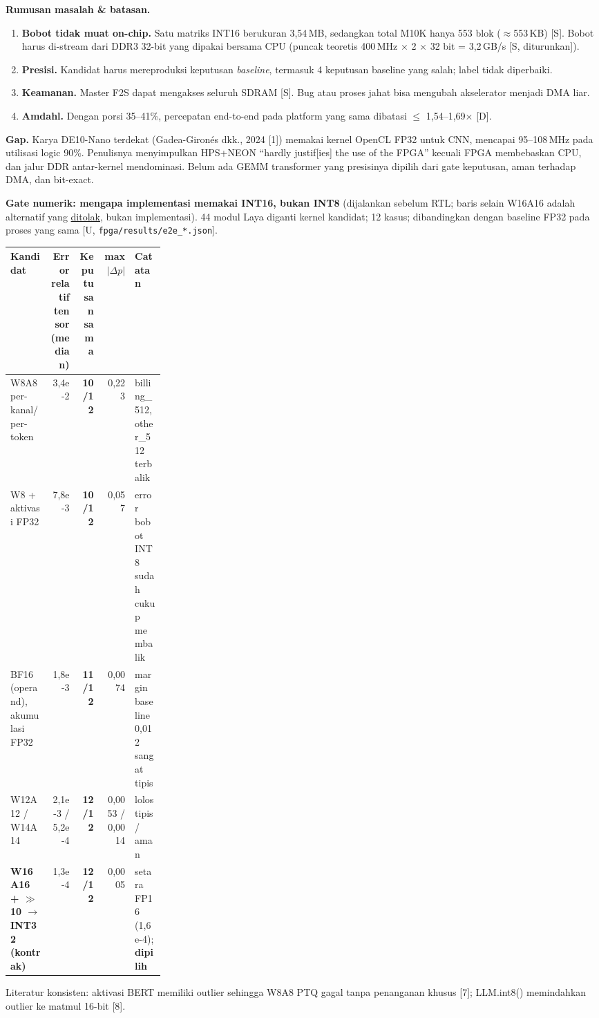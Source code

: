 \documentclass[9pt]{extarticle}
\newcommand{\hd}[1]{\cellcolor{thbg}\textbf{#1}}
\newcommand{\ok}[1]{\textcolor{ok}{\textbf{#1}}}
\newcommand{\bad}[1]{\textcolor{bad}{\textbf{#1}}}
\begin{document}
\textbf{Rumusan masalah \& batasan.}
\begin{enumerate}
\item \textbf{Bobot tidak muat on-chip.} Satu matriks INT16 berukuran 3,54\,MB, sedangkan total M10K hanya 553 blok ($\approx$553\,KB) [S]. Bobot harus di-stream dari DDR3 32-bit yang dipakai bersama CPU (puncak teoretis 400\,MHz $\times$ 2 $\times$ 32 bit = 3,2\,GB/s [S, diturunkan]).
\item \textbf{Presisi.} Kandidat harus mereproduksi keputusan \emph{baseline}, termasuk 4 keputusan baseline yang salah; label tidak diperbaiki.
\item \textbf{Keamanan.} Master F2S dapat mengakses seluruh SDRAM [S]. Bug atau proses jahat bisa mengubah akselerator menjadi DMA liar.
\item \textbf{Amdahl.} Dengan porsi 35--41\%, percepatan end-to-end pada platform yang sama dibatasi $\le$ 1,54--1,69$\times$ [D].
\end{enumerate}

\textbf{Gap.} Karya DE10-Nano terdekat (Gadea-Giron\'es dkk., 2024 [1]) memakai kernel OpenCL FP32 untuk CNN, mencapai 95--108\,MHz pada utilisasi logic 90\%. Penulisnya menyimpulkan HPS+NEON ``hardly justif[ies] the use of the FPGA'' kecuali FPGA membebaskan CPU, dan jalur DDR antar-kernel mendominasi. Belum ada GEMM transformer yang presisinya dipilih dari gate keputusan, aman terhadap DMA, dan bit-exact.

\begin{callout}
\textbf{Gate numerik: mengapa implementasi memakai INT16, bukan INT8} (dijalankan sebelum RTL; baris selain W16A16 adalah alternatif yang \underline{ditolak}, bukan implementasi). 44 modul Laya diganti kernel kandidat; 12 kasus; dibandingkan dengan baseline FP32 pada proses yang sama [U, \texttt{fpga/results/e2e\_*.json}].

{\scriptsize
\begin{tabularx}{\linewidth}{|p{0.26\linewidth}|R|R|R|L|}
\hline
\hd{Kandidat} & \hd{Error relatif tensor (median)} & \hd{Keputusan sama} & \hd{max$|\Delta p|$} & \hd{Catatan} \\ \hline
W8A8 per-kanal/per-token & 3,4e-2 & \bad{10/12} & 0,223 & billing\_512, other\_512 terbalik \\ \hline
W8 + aktivasi FP32 & 7,8e-3 & \bad{10/12} & 0,057 & error bobot INT8 sudah cukup membalik \\ \hline
BF16 (operand), akumulasi FP32 & 1,8e-3 & \bad{11/12} & 0,0074 & margin baseline 0,012 sangat tipis \\ \hline
W12A12 / W14A14 & 2,1e-3 / 5,2e-4 & \ok{12/12} & 0,0053 / 0,0014 & lolos tipis / aman \\ \hline
\textbf{W16A16 + $\gg$10 $\rightarrow$ INT32 (kontrak)} & 1,3e-4 & \ok{12/12} & 0,0005 & setara FP16 (1,6e-4); \textbf{dipilih} \\ \hline
\end{tabularx}}

Literatur konsisten: aktivasi BERT memiliki outlier sehingga W8A8 PTQ gagal tanpa penanganan khusus [7]; LLM.int8() memindahkan outlier ke matmul 16-bit [8].
\end{callout}
\end{document}
